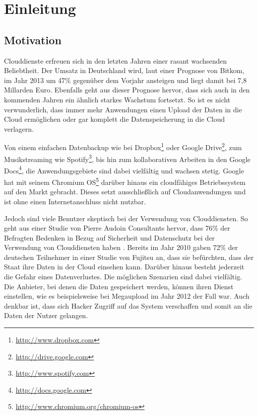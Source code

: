 \chapter{Einleitung}
\label{einleitung}

\section{Motivation}
\label{motivation}
Clouddienste erfreuen sich in den letzten Jahren einer rasant wachsenden Beliebtheit.
Der Umsatz in Deutschland wird, laut einer Prognose von Bitkom, im Jahr 2013 um 47\% gegenüber dem Vorjahr ansteigen und liegt damit bei 7,8 Millarden Euro\cite[vgl.][Seite 2]{bitkom13}.
Ebenfalls geht aus dieser Prognose hervor, dass sich auch in den kommenden Jahren ein ähnlich starkes Wachstum fortsetzt.
So ist es nicht verwunderlich, dass immer mehr Anwendungen einen Upload der Daten in die Cloud ermöglichen oder gar komplett die Datenspeicherung in die Cloud verlagern.

Von einem einfachen Datenbackup wie bei Dropbox\footnote{\url{http://www.dropbox.com}} oder Google Drive\footnote{\url{http://drive.google.com}}, zum Musikstreaming wie Spotify\footnote{\url{http://www.spotify.com}}, bis hin zum kollaborativen Arbeiten in den Google Docs\footnote{\url{http://docs.google.com}}, die Anwendungsgebiete sind dabei vielfältig und wachsen stetig.
Google hat mit seinem Chromium OS\footnote{\url{http://www.chromium.org/chromium-os}} darüber hinaus ein cloudfähiges Betriebssystem auf den Markt gebracht.
Dieses setzt ausschließlich auf Cloudanwendungen und ist ohne einen Internetanschluss nicht nutzbar.

Jedoch sind viele Benutzer skeptisch bei der Verwendung von Clouddiensten.
So geht aus einer Studie von Pierre Audoin Consultants hervor, dass 76\% der Befragten Bedenken in Bezug auf Sicherheit und Datenschutz bei der Verwendung von Clouddiensten haben \cite[vgl.][Seite 23]{pier13}.
Bereits im Jahr 2010 gaben 72\% der deutschen Teilnehmer in einer Studie von Fujitsu an, dass sie befürchten, dass der Staat ihre Daten in der Cloud einsehen kann\cite[vgl.][Seite 05]{fuji13}.
Darüber hinaus besteht jederzeit die Gefahr eines Datenverlustes.
Die möglichen Szenarien sind dabei vielfältig.
Die Anbieter, bei denen die Daten gespeichert werden, können ihren Dienst einstellen, wie es beispielsweise bei Megaupload im Jahr 2012 der Fall war\cite[vgl.][]{mega12}.
Auch denkbar ist, dass sich Hacker Zugriff auf das System verschaffen und somit an die Daten der Nutzer gelangen.

